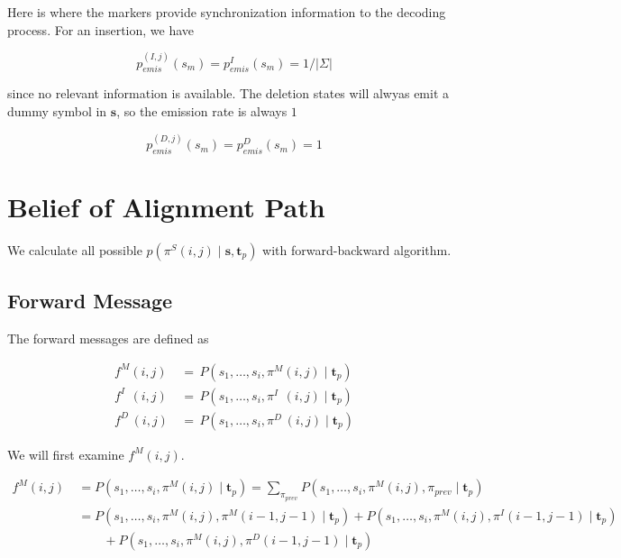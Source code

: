 \documentclass[10pt]{article}
\begin{document}
  Here is where the markers provide synchronization information to the decoding process. For an insertion, we have

  \begin{equation}
    p_{emis}^{(I, j)}(s_m) = p_{emis}^{I}(s_m) = 1 / |\Sigma|
  \end{equation}

  since no relevant information is available. The deletion states will alwyas emit a dummy symbol in $\mathbf{s}$, so the emission rate is always $1$

  \begin{equation}
    p_{emis}^{(D, j)}(s_m) =  p_{emis}^{D}(s_m) =  1
  \end{equation}

    
\section{Belief of Alignment Path}

  We calculate all possible $p\left(\pi^S(i, j) \;|\; \mathbf{s}, \mathbf{t}_p\right)$ with forward-backward algorithm.

  \subsection{Forward Message}
    
    The forward messages are defined as

    \begin{equation}
    \begin{aligned}
      f^{M}(i, j) \,&=\, P(s_1, \dots,s_i, \pi^M(i, j) \;|\; \mathbf{t}_{p}) \\
      f^{I\;\;}(i, j) \,&=\, P(s_1, \dots,s_i, \pi^{I\;\;}(i, j) \;|\; \mathbf{t}_{p}) \\
      f^{D\;}(i, j) \,&=\, P(s_1, \dots,s_i, \pi^{D\;}(i, j) \;|\; \mathbf{t}_{p})
    \end{aligned}
    \end{equation}

    We will first examine $f^{M}(i, j)$.

    \begin{equation} \label{eq111}
    \begin{aligned}
      f^{M}(i, j) \
        &= P(s_1, \dots,s_i, \pi^M(i, j) \;|\; \mathbf{t}_{p}) = \sum\nolimits_{\pi_{prev}} P(s_1, \dots,s_i, \pi^M(i, j), \pi_{prev} \;|\; \mathbf{t}_{p}) \\
        &= P(s_1, \dots,s_i, \pi^M(i, j), \pi^M(i-1, j-1) \;|\; \mathbf{t}_{p}) + P( s_1, \dots,s_i, \pi^M(i, j), \pi^{I}(i-1, j-1) \;|\; \mathbf{t}_{p})  \\
        &\qquad + P(s_1, \dots,s_i, \pi^M(i, j), \pi^{D}(i-1, j-1) \;|\; \mathbf{t}_{p})
    \end{aligned}
    \end{equation}
\end{document}
